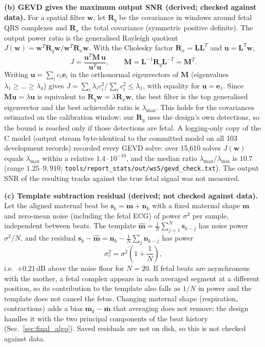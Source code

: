 \begin{finalpart}
\noindent\textbf{(b) GEVD gives the maximum output SNR (derived; checked against data).} For a spatial filter $\mathbf{w}$, let $\mathbf{R}_q$ be the covariance in windows around fetal QRS complexes and $\mathbf{R}_x$ the total covariance (symmetric positive definite). The output power ratio is the generalised Rayleigh quotient $J(\mathbf{w}) = \mathbf{w}^T \mathbf{R}_q \mathbf{w} / \mathbf{w}^T \mathbf{R}_x \mathbf{w}$. With the Cholesky factor $\mathbf{R}_x = \mathbf{L}\mathbf{L}^T$ and $\mathbf{u} = \mathbf{L}^T\mathbf{w}$,
\begin{equation}
J = \frac{\mathbf{u}^T \mathbf{M}\, \mathbf{u}}{\mathbf{u}^T\mathbf{u}}, \qquad \mathbf{M} = \mathbf{L}^{-1}\mathbf{R}_q\mathbf{L}^{-T} = \mathbf{M}^T .
\end{equation}
Writing $\mathbf{u} = \sum_i c_i \mathbf{e}_i$ in the orthonormal eigenvectors of $\mathbf{M}$ (eigenvalues $\lambda_1 \ge \dots \ge \lambda_4$) gives $J = \sum_i \lambda_i c_i^2 / \sum_i c_i^2 \le \lambda_1$, with equality for $\mathbf{u} = \mathbf{e}_1$. Since $\mathbf{M}\mathbf{u} = \lambda\mathbf{u}$ is equivalent to $\mathbf{R}_q\mathbf{w} = \lambda\mathbf{R}_x\mathbf{w}$, the best filter is the top generalised eigenvector and the best achievable ratio is $\lambda_{\max}$. This holds for the covariances estimated on the calibration window; our $\mathbf{R}_q$ uses the design's own detections, so the bound is reached only if those detections are fetal. A logging-only copy of the C model (output stream byte-identical to the committed model on all 103 development records) recorded every GEVD solve: over 15,610 solves $J(\mathbf{w})$ equals $\lambda_{\max}$ within a relative $1.4\cdot10^{-10}$, and the median ratio $\lambda_{\max}/\lambda_{\min}$ is $10.7$ (range $1.25$--$9{,}910$; \texttt{tools/report\_stats/out/ws5/gevd\_check.txt}). The output SNR of the resulting tracks against the true fetal signal was not measured.

\noindent\textbf{(c) Template subtraction residual (derived; not checked against data).} Let the aligned maternal beat be $\mathbf{s}_k = \mathbf{m} + \mathbf{n}_k$ with a fixed maternal shape $\mathbf{m}$ and zero-mean noise (including the fetal ECG) of power $\sigma^2$ per sample, independent between beats. The template $\hat{\mathbf{m}} = \frac{1}{N}\sum_{j=1}^{N}\mathbf{s}_{k-j}$ has noise power $\sigma^2/N$, and the residual $\mathbf{s}_k - \hat{\mathbf{m}} = \mathbf{n}_k - \frac{1}{N}\sum_j \mathbf{n}_{k-j}$ has power
\begin{equation}
\sigma_r^2 = \sigma^2\left(1 + \frac{1}{N}\right),
\end{equation}
i.e.\ $+0.21\,$dB above the noise floor for $N = 20$. If fetal beats are asynchronous with the mother, a fetal complex appears in each averaged segment at a different position, so its contribution to the template also falls as $1/N$ in power and the template does not cancel the fetus. Changing maternal shape (respiration, contractions) adds a bias $\mathbf{m}_k - \bar{\mathbf{m}}$ that averaging does not remove; the design handles it with the two principal components of the beat history (Sec.~\ref{sec:final_algo}). Saved residuals are not on disk, so this is not checked against data.


\end{finalpart}
